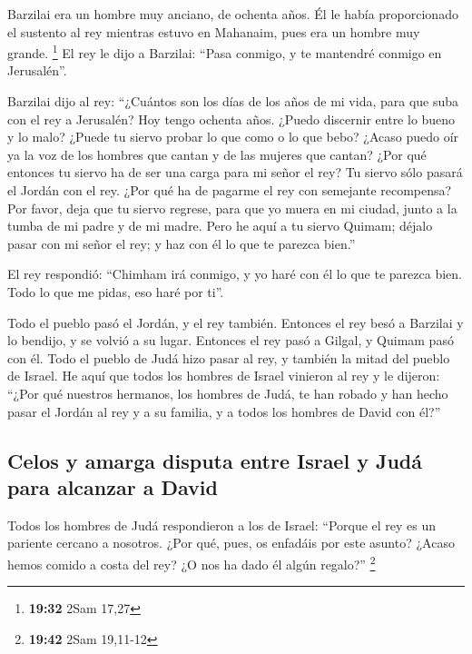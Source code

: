 \begin{paracol}{2}
 Barzilai era un hombre muy anciano, de ochenta años. Él
le había proporcionado el sustento al rey mientras estuvo en Mahanaim,
pues era un hombre muy grande. \footnote{\textbf{19:32} 2Sam 17,27}
 El rey le dijo a Barzilai: ``Pasa conmigo, y te
mantendré conmigo en Jerusalén''.

 Barzilai dijo al rey: ``¿Cuántos son los días de los
años de mi vida, para que suba con el rey a Jerusalén? 
Hoy tengo ochenta años. ¿Puedo discernir entre lo bueno y lo malo?
¿Puede tu siervo probar lo que como o lo que bebo? ¿Acaso puedo oír ya
la voz de los hombres que cantan y de las mujeres que cantan? ¿Por qué
entonces tu siervo ha de ser una carga para mi señor el rey?
 Tu siervo sólo pasará el Jordán con el rey. ¿Por qué ha
de pagarme el rey con semejante recompensa?  Por favor,
deja que tu siervo regrese, para que yo muera en mi ciudad, junto a la
tumba de mi padre y de mi madre. Pero he aquí a tu siervo Quimam; déjalo
pasar con mi señor el rey; y haz con él lo que te parezca bien.''

 El rey respondió: ``Chimham irá conmigo, y yo haré con
él lo que te parezca bien. Todo lo que me pidas, eso haré por ti''.

 Todo el pueblo pasó el Jordán, y el rey también.
Entonces el rey besó a Barzilai y lo bendijo, y se volvió a su lugar.
 Entonces el rey pasó a Gilgal, y Quimam pasó con él.
Todo el pueblo de Judá hizo pasar al rey, y también la mitad del pueblo
de Israel.  He aquí que todos los hombres de Israel
vinieron al rey y le dijeron: ``¿Por qué nuestros hermanos, los hombres
de Judá, te han robado y han hecho pasar el Jordán al rey y a su
familia, y a todos los hombres de David con él?''

\hypertarget{celos-y-amarga-disputa-entre-israel-y-juduxe1-para-alcanzar-a-david}{%
\subsection{Celos y amarga disputa entre Israel y Judá para alcanzar a
David}\label{celos-y-amarga-disputa-entre-israel-y-juduxe1-para-alcanzar-a-david}}

 Todos los hombres de Judá respondieron a los de Israel:
``Porque el rey es un pariente cercano a nosotros. ¿Por qué, pues, os
enfadáis por este asunto? ¿Acaso hemos comido a costa del rey? ¿O nos ha
dado él algún regalo?'' \footnote{\textbf{19:42} 2Sam 19,11-12}


\end{paracol}
